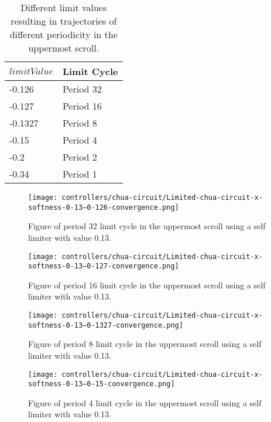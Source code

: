 \documentclass[main]{subfiles}
\begin{document}
\begin{table}[H]
\renewcommand{\arraystretch}{1.2}
\center
\begin{tabular}{@{}ll@{}}
	\toprule
   \(limitValue\) & Limit Cycle\\
   \midrule
   -0.126 & Period 32 \\
   -0.127 & Period 16 \\
   -0.1327 & Period 8 \\ 
   -0.15 & Period 4 \\
   -0.2  & Period 2 \\
   -0.34 & Period 1 \\
   \bottomrule
\end{tabular}
\caption[Limiter values for periodic trajectories for for an x self-limiting limiter with softness 0.13]{Different limit values resulting in trajectories of different periodicity in the uppermost scroll.}
\label{table:x-0.13-periodicities}
\end{table}

\begin{figure}[H]
\centering
\texttt{[image: controllers/chua-circuit/Limited-chua-circuit-x-softness-0-13--0-126-convergence.png]}
\caption[Figure of period 32 limit cycle]{Figure of period 32 limit cycle in the uppermost scroll using a self limiter with value 0.13.}
\label{figure:x-0.13-32-limit-cycle-upperscroll-trajectory}
\end{figure}

\begin{figure}[H]
\centering
\texttt{[image: controllers/chua-circuit/Limited-chua-circuit-x-softness-0-13--0-127-convergence.png]}
\caption[Figure of period 16 limit cycle]{Figure of period 16 limit cycle in the uppermost scroll using a self limiter with value 0.13.}
\label{figure:x-0.13-16-limit-cycle-upperscroll-trajectory}
\end{figure}

\begin{figure}[H]
\centering
\texttt{[image: controllers/chua-circuit/Limited-chua-circuit-x-softness-0-13--0-1327-convergence.png]}
\caption[Figure of period 8 limit cycle]{Figure of period 8 limit cycle in the uppermost scroll using a self limiter with value 0.13.}
\label{figure:x-0.13-8-limit-cycle-upperscroll-trajectory}
\end{figure}

\begin{figure}[H]
\centering
\texttt{[image: controllers/chua-circuit/Limited-chua-circuit-x-softness-0-13--0-15-convergence.png]}
\caption[Figure of period 4 limit cycle]{Figure of period 4 limit cycle in the uppermost scroll using a self limiter with value 0.13.}
\label{figure:x-0.13-4-limit-cycle-upperscroll-trajectory}
\end{figure}
\end{document}
